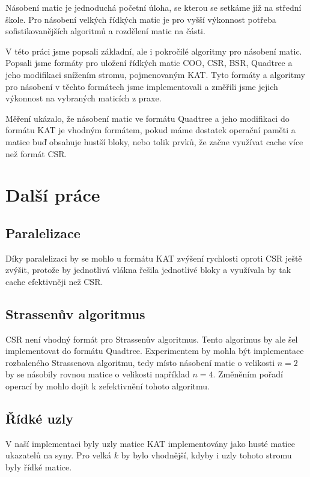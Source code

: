 \documentclass[thesis=B,czech]{FITthesis}[2012/06/26]
\begin{document}
\begin{conclusion}

Násobení matic je jednoduchá početní úloha, se kterou se setkáme již na střední škole. Pro násobení velkých řídkých matic je pro vyšší výkonnost potřeba  sofistikovanějších algoritmů a rozdělení matic na části.

V této práci jsme popsali základní, ale i pokročilé algoritmy pro násobení matic. Popsali jsme formáty pro uložení řídkých matic COO, CSR, BSR, Quadtree a jeho modifikaci snížením stromu, pojmenovaným KAT. Tyto formáty a algoritmy pro násobení v těchto formátech jsme implementovali a změřili jsme jejich výkonnost na vybraných maticích z praxe.

Měření ukázalo, že násobení matic ve formátu Quadtree a jeho modifikaci do formátu KAT je vhodným formátem, pokud máme dostatek operační paměti a matice buď obsahuje hustší bloky, nebo tolik prvků, že začne využívat cache více než formát CSR.

\section{Další práce}

\subsection{Paralelizace}

Díky paralelizaci by se mohlo u formátu KAT zvýšení rychlosti oproti CSR ještě zvýšit, protože by jednotlivá vlákna řešila jednotlivé bloky a využívala by tak cache efektivněji než CSR. 

\subsection{Strassenův algoritmus}

CSR není vhodný formát pro Strassenův algoritmus. Tento algorimus by ale šel implementovat do formátu Quadtree. Experimentem by mohla být implementace rozbaleného Strassenova algoritmu, tedy místo násobení matic o velikosti $n = 2$ by se násobily rovnou matice o velikosti například $n = 4$. Změněním pořadí operací by mohlo dojít k zefektivnění tohoto algoritmu. 

\subsection{Řídké uzly}
	
V naší implementaci byly uzly matice KAT implementovány jako husté matice ukazatelů na syny. Pro velká $k$ by bylo vhodnější, kdyby i uzly tohoto stromu byly řídké matice.	
	
\end{conclusion}
\end{document}
